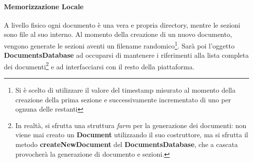 \paragraph{Memorizzazione Locale}
A livello fisico ogni documento è una vera e propria directory, mentre le sezioni sono file al suo interno. Al momento della creazione di un nuovo documento, vengono generate le sezioni aventi un filename randomico\footnote{Si è scelto di utilizzare il valore del timestamp misurato al momento della creazione della prima sezione e successivamente incrementato di uno per ognuna delle restanti}. Sarà poi l'oggetto \textbf{DocumentsDatabase} ad occuparsi di mantenere i riferimenti alla lista completa dei documenti\footnote{In realtà, si sfrutta una struttura \textit{farm} per la generazione dei documenti: non viene mai creato un \textbf{Document} utilizzando il suo costruttore, ma si sfrutta il metodo \textbf{createNewDocument} del \textbf{DocumentsDatabase}, che a cascata provocherà la generazione di documento e sezioni.} e ad interfacciarsi con il resto della piattaforma.